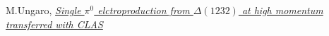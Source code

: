 \begin{thebibliography}{mybib}
  {M.Ungaro},  \href{https://maureeungaro.github.io/home/meson/pi0_delta/pi0_delta}{\it Single $\pi^0$ elctroproduction from $\Delta(1232)$ at high momentum transferred with CLAS}
\end{thebibliography}
